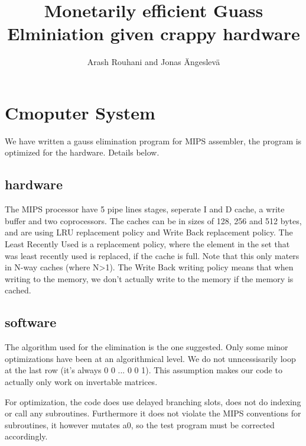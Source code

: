 \documentclass[a4paper,11pt]{article}
\title{Monetarily efficient Guass Elminiation given crappy hardware}
\author{Arash Rouhani and Jonas Ängeslevä}
\begin{document}
\maketitle

\begin{abstract}

\end{abstract}

\section{Cmoputer System}
We have written a gauss elimination program for MIPS assembler, the program is optimized for the hardware. Details below.
\subsection{hardware}
The MIPS processor have 5 pipe lines stages, seperate I and D cache, a write buffer and two coprocessors.
The caches can be in sizes of 128, 256 and 512 bytes, and are using LRU replacement policy and Write Back replacement policy.
The Least Recently Used is a replacement policy, where the element in the set that was least recently used is replaced, if the cache is full. Note that this only maters in N-way caches (where N>1).
The Write Back writing policy means that when writing to the memory, we don't actually write to the memory if the memory is cached. 
\subsection{software}
The algorithm used for the elimination is the one suggested.
Only some minor optimizations have been at an algorithmical level. We do not unncessisarily loop at the last row (it's always 0 0 ... 0 0 1).
This assumption makes our code to actually only work on invertable matrices.

For optimization, the code does use delayed branching slots, does not do indexing or call any subroutines. 
Furthermore it does not violate the MIPS conventions for subroutines, it however mutates a0, so the test program must be corrected accordingly.
\end{document}
